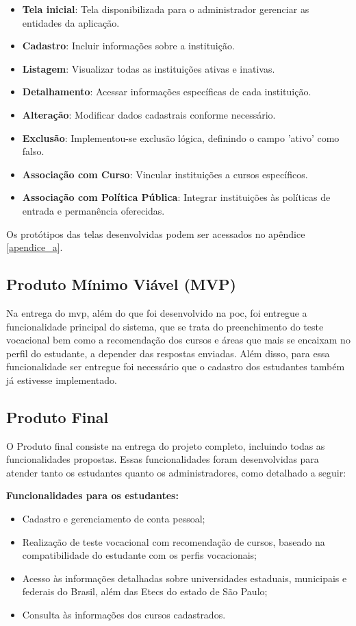 \begin{itemize}
    \item \textbf{Tela inicial}: Tela disponibilizada para o administrador gerenciar as entidades da aplicação.
    \item \textbf{Cadastro}: Incluir informações sobre a instituição. 
    \item \textbf{Listagem}: Visualizar todas as instituições ativas e inativas.
    \item \textbf{Detalhamento}: Acessar informações específicas de cada instituição.
    \item \textbf{Alteração}: Modificar dados cadastrais conforme necessário.
    \item \textbf{Exclusão}: Implementou-se exclusão lógica, definindo o campo 'ativo' como falso. 
    \item \textbf{Associação com Curso}: Vincular instituições a cursos específicos.
    \item \textbf{Associação com Política Pública}: Integrar instituições às políticas de entrada e permanência oferecidas.
\end{itemize}

 Os protótipos das telas desenvolvidas podem ser acessados no apêndice \ref{apendice_a}.


\subsection{Produto Mínimo Viável (MVP)}

Na entrega do \ac{mvp}, além do que foi desenvolvido na \ac{poc}, foi entregue a funcionalidade principal do sistema, que se trata do preenchimento do teste vocacional  bem como a recomendação dos cursos e áreas que mais se encaixam no perfil do estudante, a depender das respostas enviadas. Além disso, para essa funcionalidade ser entregue foi necessário que o cadastro dos estudantes também já estivesse implementado. 


\subsection{Produto Final}

O Produto final consiste na entrega do projeto completo, incluindo todas as funcionalidades propostas. Essas funcionalidades foram desenvolvidas para atender tanto os estudantes quanto os administradores, como detalhado a seguir:

\textbf{Funcionalidades para os estudantes:}  
\begin{itemize}
    \item Cadastro e gerenciamento de conta pessoal;  
    \item Realização de teste vocacional com recomendação de cursos, baseado na compatibilidade do estudante com os perfis vocacionais; 
    \item Acesso às informações detalhadas sobre universidades estaduais, municipais e federais do Brasil, além das Etecs do estado de São Paulo;  
    \item Consulta às informações dos cursos cadastrados. 
\end{itemize}

